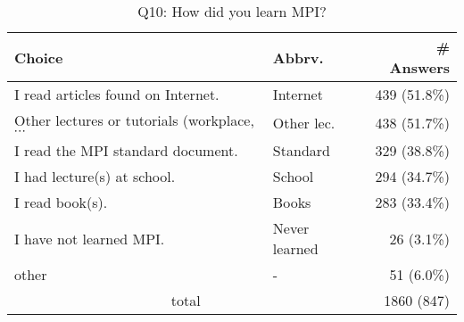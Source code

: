 \begin{table}[htb]%
\begin{center}%
\caption{Q10: How did you learn MPI?}%
\label{tab:Q10-ans}%
\begin{tabular}{l|l|r}%
\hline%
Choice & Abbrv. & \# Answers \\%
\hline%
I read articles found on Internet. & Internet & 439 (51.8\%) \\%
{\small Other lectures or tutorials (workplace, $\cdots$} & Other lec. & 438 (51.7\%) \\%
I read the MPI standard document. & Standard & 329 (38.8\%) \\%
I had lecture(s) at school. & School & 294 (34.7\%) \\%
I read book(s). & Books & 283 (33.4\%) \\%
I have not learned MPI. & Never learned & 26 (3.1\%) \\%
other & - & 51 (6.0\%) \\%
\hline%
\multicolumn{2}{c}{total} & 1860 (847)\\%
\hline%
\end{tabular}%
\end{center}%
\end{table}%
